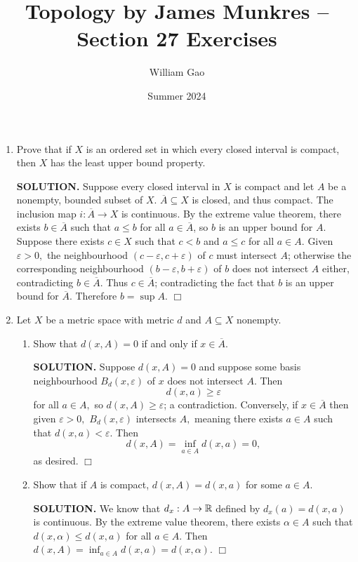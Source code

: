 \documentclass{article}
\title{Topology by James Munkres -- Section 27 Exercises}
\author{William Gao}
\date{Summer 2024}
\begin{document}
\maketitle

\begin{enumerate}
    \item Prove that if $X$ is an ordered set in which every closed interval is compact, then $X$ has the least upper bound property.

    {\bf SOLUTION.} Suppose every closed interval in $X$ is compact and let $A$ be a nonempty, bounded subset of $X$. $\overline{A} \subseteq X$ is closed, and thus compact. The inclusion map $i: \overline{A} \rightarrow X$ is continuous. By the extreme value theorem, there exists $b \in \overline{A}$ such that $a \leq b$ for all $a \in \overline{A}$, so $b$ is an upper bound for $A.$ Suppose there exists $c \in X$ such that $c < b$ and $a \leq c$ for all $a \in A.$ Given $\varepsilon > 0,$ the neighbourhood $(c-\varepsilon, c+\varepsilon)$ of $c$ must intersect $A$; otherwise the corresponding neighbourhood $(b-\varepsilon, b+ \varepsilon)$ of $b$ does not intersect $A$ either, contradicting $b \in \overline{A}.$ Thus $c \in \overline{A}$; contradicting the fact that $b$ is an upper bound for $\overline{A}.$ Therefore $b = \sup A.$ $\Box$

    \item Let $X$ be a metric space with metric $d$ and $A \subseteq X$ nonempty.
    \begin{enumerate}
        \item Show that $d(x, A) = 0$ if and only if $x \in \overline{A}.$

        {\bf SOLUTION.} Suppose $d(x, A) = 0$ and suppose some basis neighbourhood $B_d(x, \varepsilon)$ of $x$ does not intersect $A.$ Then
        $$d(x, a) \geq \varepsilon$$
        for all $a \in A,$ so $d(x, A) \geq \varepsilon$; a contradiction. Conversely, if $x \in \overline{A}$ then given $\varepsilon > 0,$ $B_d(x, \varepsilon)$ intersects $A,$ meaning there exists $a \in A$ such that $d(x, a) < \varepsilon.$ Then 
        $$d(x, A) = \inf_{a \in A} d(x, a) = 0,$$
        as desired. $\Box$
        
        \item Show that if $A$ is compact, $d(x, A) = d(x, a)$ for some $a \in A.$

        {\bf SOLUTION.} We know that $d_x: A \rightarrow \mathbb{R}$ defined by $d_x(a) = d(x, a)$ is continuous. By the extreme value theorem, there exists $\alpha \in A$ such that $d(x, \alpha) \leq d(x, a)$ for all $a \in A.$ Then $d(x, A) = \inf_{a \in A} d(x, a) = d(x, \alpha).$ $\Box$
        

\end{enumerate}
\end{enumerate}
\end{document}
